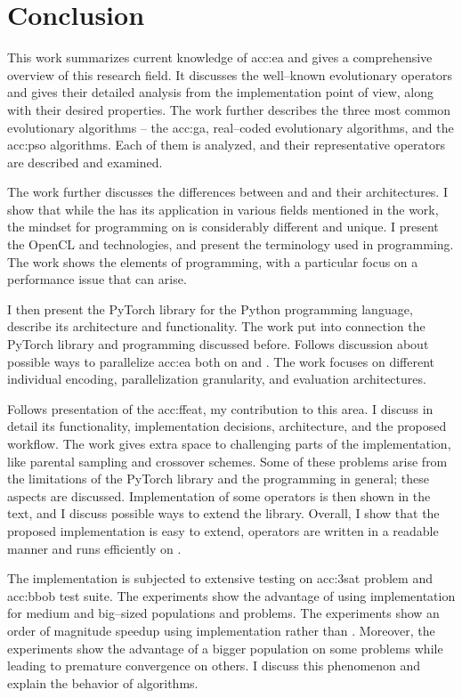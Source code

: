 \chapter{Conclusion}
\label{chap:conclusion}

This work summarizes current knowledge of \acrlong*{acc:ea} and gives a comprehensive overview of this research field. It discusses the well--known evolutionary operators and gives their detailed analysis from the implementation point of view, along with their desired properties. The work further describes the three most common evolutionary algorithms -- the \acrlong{acc:ga}, real--coded evolutionary algorithms, and the \acrlong{acc:pso} algorithms. Each of them is analyzed, and their representative operators are described and examined.

The work further discusses the differences between \cpu and \gpu and their architectures. I show that while the \gpu has its application in various fields mentioned in the work, the mindset for programming on \gpu is considerably different and unique. I present the OpenCL and \cuda technologies, and present the terminology used in \gpu programming. The work shows the elements of \cuda programming, with a particular focus on a performance issue that can arise. 

I then present the PyTorch library for the Python programming language, describe its architecture and functionality. The work put into connection the PyTorch library and \cuda programming discussed before. Follows discussion about possible ways to parallelize \acrlong{acc:ea} both on \cpu and \gpuns. The work focuses on different individual encoding, parallelization granularity, and evaluation architectures.

Follows presentation of the \acrfull{acc:ffeat}, my contribution to this area. I discuss in detail its functionality, implementation decisions, architecture, and the proposed workflow. The work gives extra space to challenging parts of the implementation, like parental sampling and crossover schemes. Some of these problems arise from the limitations of the PyTorch library and the \cuda programming in general; these aspects are discussed. Implementation of some operators is then shown in the text, and I discuss possible ways to extend the library. Overall, I show that the proposed implementation is easy to extend, operators are written in a readable manner and runs efficiently on \gpuns.

The implementation is subjected to extensive testing on \acrshort{acc:3sat} problem and \acrshort{acc:bbob} test suite. The experiments show the advantage of using \cuda implementation for medium and big--sized populations and problems. The experiments show an order of magnitude speedup using \cuda implementation rather than \cpuns. Moreover, the experiments show the advantage of a bigger population on some problems while leading to premature convergence on others. I discuss this phenomenon and explain the behavior of algorithms.

